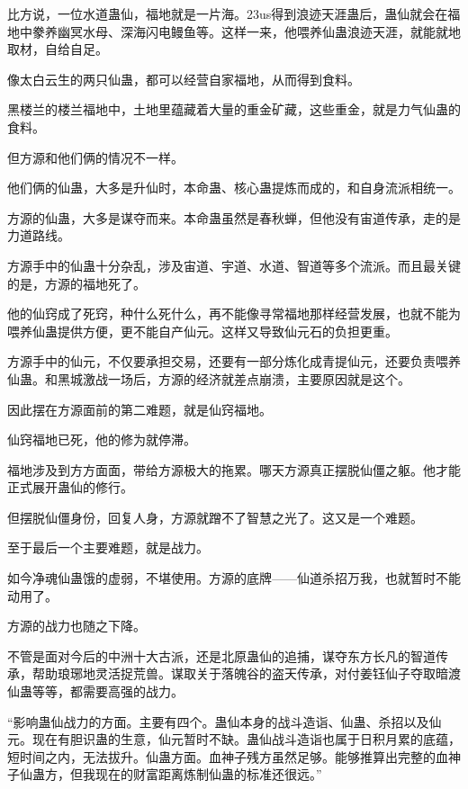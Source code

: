 
\begin{this_body}

比方说，一位水道蛊仙，福地就是一片海。23us得到浪迹天涯蛊后，蛊仙就会在福地中豢养幽冥水母、深海闪电鳗鱼等。这样一来，他喂养仙蛊浪迹天涯，就能就地取材，自给自足。

像太白云生的两只仙蛊，都可以经营自家福地，从而得到食料。

黑楼兰的楼兰福地中，土地里蕴藏着大量的重金矿藏，这些重金，就是力气仙蛊的食料。

但方源和他们俩的情况不一样。

他们俩的仙蛊，大多是升仙时，本命蛊、核心蛊提炼而成的，和自身流派相统一。

方源的仙蛊，大多是谋夺而来。本命蛊虽然是春秋蝉，但他没有宙道传承，走的是力道路线。

方源手中的仙蛊十分杂乱，涉及宙道、宇道、水道、智道等多个流派。而且最关键的是，方源的福地死了。

他的仙窍成了死窍，种什么死什么，再不能像寻常福地那样经营发展，也就不能为喂养仙蛊提供方便，更不能自产仙元。这样又导致仙元石的负担更重。

方源手中的仙元，不仅要承担交易，还要有一部分炼化成青提仙元，还要负责喂养仙蛊。和黑城激战一场后，方源的经济就差点崩溃，主要原因就是这个。

因此摆在方源面前的第二难题，就是仙窍福地。

仙窍福地已死，他的修为就停滞。

福地涉及到方方面面，带给方源极大的拖累。哪天方源真正摆脱仙僵之躯。他才能正式展开蛊仙的修行。

但摆脱仙僵身份，回复人身，方源就蹭不了智慧之光了。这又是一个难题。

至于最后一个主要难题，就是战力。

如今净魂仙蛊饿的虚弱，不堪使用。方源的底牌——仙道杀招万我，也就暂时不能动用了。

方源的战力也随之下降。

不管是面对今后的中洲十大古派，还是北原蛊仙的追捕，谋夺东方长凡的智道传承，帮助琅琊地灵活捉荒兽。谋取关于落魄谷的盗天传承，对付姜钰仙子夺取暗渡仙蛊等等，都需要高强的战力。

“影响蛊仙战力的方面。主要有四个。蛊仙本身的战斗造诣、仙蛊、杀招以及仙元。现在有胆识蛊的生意，仙元暂时不缺。蛊仙战斗造诣也属于日积月累的底蕴，短时间之内，无法拔升。仙蛊方面。血神子残方虽然足够。能够推算出完整的血神子仙蛊方，但我现在的财富距离炼制仙蛊的标准还很远。”


\end{this_body}
